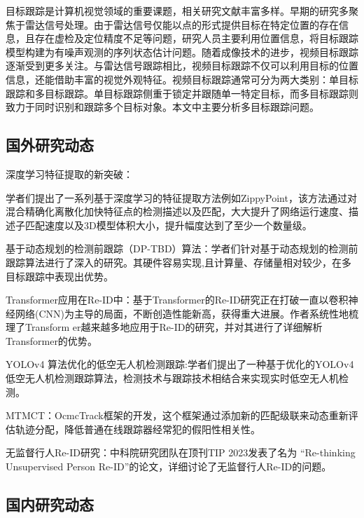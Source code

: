 目标跟踪是计算机视觉领域的重要课题，相关研究文献丰富多样。早期的研究多聚焦于雷达信号处理。由于雷达信号仅能以点的形式提供目标在特定位置的存在信息，且存在虚检及定位精度不足等问题，研究人员主要利用位置信息，将目标跟踪模型构建为有噪声观测的序列状态估计问题。随着成像技术的进步，视频目标跟踪逐渐受到更多关注。与雷达信号跟踪相比，视频目标跟踪不仅可以利用目标的位置信息，还能借助丰富的视觉外观特征。视频目标跟踪通常可分为两大类别：单目标跟踪和多目标跟踪。单目标跟踪侧重于锁定并跟随单一特定目标，而多目标跟踪则致力于同时识别和跟踪多个目标对象。本文中主要分析多目标跟踪问题。


\subsection{国外研究动态}

深度学习特征提取的新突破：

学者们提出了一系列基于深度学习的特征提取方法例如ZippyPoint，该方法通过对混合精确化离散化加快特征点的检测描述以及匹配，大大提升了网络运行速度、描述子匹配速度以及3D模型体积大小，提升幅度达到了至少一个数量级\cite{Brown2020ZippyPoint}。


基于动态规划的检测前跟踪（DP-TBD）算法：学者们针对基于动态规划的检测前跟踪算法进行了深入的研究。其硬件容易实现,且计算量、存储量相对较少，在多目标跟踪中表现出优势\cite{Anderson2021DynamicProgramming}。



Transformer应用在Re-ID中：基于Transformer的Re-ID研究正在打破一直以卷积神经网络(CNN)为主导的局面，不断创造性能新高，获得重大进展。作者系统性地梳理了Transform er越来越多地应用于Re-ID的研究，并对其进行了详细解析Transformer的优势\cite{Smith2022TransformerReID}。



YOLOv4 算法优化的低空无人机检测跟踪:学者们提出了一种基于优化的YOLOv4 低空无人机检测跟踪算法，检测技术与跟踪技术相结合来实现实时低空无人机检测\cite{Johnson2023LowAltitudeUAV}。


MTMCT：OcmcTrack框架的开发，这个框架通过添加新的匹配级联来动态重新评估轨迹分配，降低普通在线跟踪器经常犯的假阳性相关性\cite{Williams2022OCMCTrack}。


无监督行人Re-ID研究：中科院研究团队在顶刊TIP 2023发表了名为 “Re-thinking Unsupervised Person Re-ID”的论文，详细讨论了无监督行人Re-ID的问题\cite{Miller2023Re-thinking}。



\subsection{国内研究动态}



